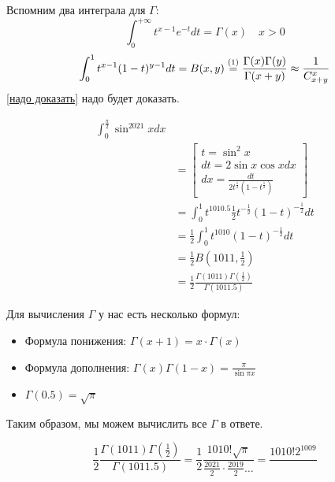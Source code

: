 

\cfoot{}



Вспомним два интеграла для \(\Gamma\):
\[\int_0^{+\infty} t^{x - 1} e^{ - t} dt = \Gamma(x) \quad x > 0\]
\[\int_0^1 t^{x - 1} (1 - t)^{y - 1} dt = B(x, y) \symrefeq{надо доказать} \frac{\Gamma(x)\Gamma(y)}{\Gamma(x + y)} \approx \frac{1}{C^x_{x + y}}\]
\ref{надо доказать} надо будет доказать.

\begin{example}
    \begin{align*}
        \int_0^{\frac{\pi}{2}} \sin^{2021} x dx                                             \\
         & = \begin{bmatrix} t = \sin^2 x \\ dt = 2 \sin x \cos x dx  \\ dx = \frac{dt}{2t^{\frac{1}{2}} (1 - t^{\frac{1}{2}})}\end{bmatrix}                                                      \\
         & = \int_0^1 t^{1010.5} \frac{1}{2} t^{ - \frac{1}{2}} (1 - t)^{ - \frac{1}{2}} dt \\
         & = \frac{1}{2}\int_0^1 t^{1010} (1 - t)^{ - \frac{1}{2}}dt                        \\
         & = \frac{1}{2}B(1011, \frac{1}{2})                                                \\
         & = \frac{1}{2} \frac{\Gamma(1011)\Gamma(\frac{1}{2})}{\Gamma(1011.5)}
    \end{align*}
\end{example}

Для вычисления \(\Gamma\) у нас есть несколько формул:
\begin{itemize}
    \item Формула понижения: \(\Gamma(x + 1) = x \cdot \Gamma(x)\)
    \item Формула дополнения: \(\Gamma(x)\Gamma(1 - x) = \frac{\pi}{\sin \pi x}\)
    \item \(\Gamma(0.5) = \sqrt{\pi}\)
\end{itemize}

Таким образом, мы можем вычислить все \(\Gamma\) в ответе.

\[\frac{1}{2} \frac{\Gamma(1011)\Gamma(\frac{1}{2})}{\Gamma(1011.5)} = \frac{1}{2} \frac{1010! \sqrt{\pi}}{\frac{2021}{2}\cdot \frac{2019}{2} \dots } = \frac{1010! 2^{1009}}{} \]

